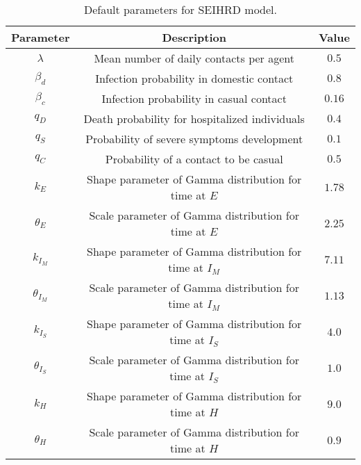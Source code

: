 \documentclass[11pt,a4paper]{article}
\begin{document}
\begin{table}
    \captionsetup{width=0.5\textwidth}
    \begin{center}
        \begin{tabular}{ |c|c|c| }
            \hline
            Parameter & Description & Value \\ 
            \hline
            $\lambda$      & Mean number of daily contacts per agent                 & $0.5$ \\ 
            $\beta_d$      & Infection probability in domestic contact               & $0.8$ \\ 
            $\beta_c$      & Infection probability in casual contact                 & $0.16$ \\ 
            $q_D$          & Death probability for hospitalized individuals          & $0.4$ \\ 
            $q_S$          & Probability of severe symptoms development              & $0.1$ \\ 
            $q_C$          & Probability of a contact to be casual                   & $0.5$ \\ 
            $k_{E}$        & Shape parameter of Gamma distribution for time at $E$   & $1.78$ \\ 
            $\theta_{E}$   & Scale parameter of Gamma distribution for time at $E$   & $2.25$ \\ 
            $k_{I_M}$      & Shape parameter of Gamma distribution for time at $I_M$ & $7.11$ \\ 
            $\theta_{I_M}$ & Scale parameter of Gamma distribution for time at $I_M$ & $1.13$ \\ 
            $k_{I_S}$      & Shape parameter of Gamma distribution for time at $I_S$ & $4.0$ \\ 
            $\theta_{I_S}$ & Scale parameter of Gamma distribution for time at $I_S$ & $1.0$ \\ 
            $k_{H}$        & Shape parameter of Gamma distribution for time at $H$   & $9.0$ \\ 
            $\theta_{H}$   & Scale parameter of Gamma distribution for time at $H$   & $0.9$ \\ 
            \hline
        \end{tabular}
    \end{center}
    \caption{Default parameters for SEIHRD model.}
    \label{table:default_params}
\end{table}
\end{document}
